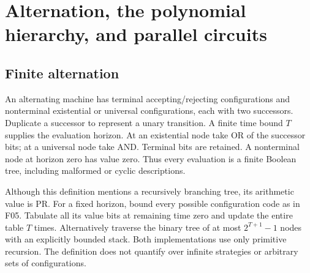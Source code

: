 \section{Alternation, the polynomial hierarchy, and parallel circuits}
\label{sec:alternation}

\subsection{Finite alternation}
An alternating machine has terminal accepting/rejecting configurations and nonterminal existential or universal configurations, each with two successors. Duplicate a successor to represent a unary transition. A finite time bound $T$ supplies the evaluation horizon. At an existential node take OR of the successor bits; at a universal node take AND. Terminal bits are retained. A nonterminal node at horizon zero has value zero. Thus every evaluation is a finite Boolean tree, including malformed or cyclic descriptions.

Although this definition mentions a recursively branching tree, its arithmetic value is PR. For a fixed horizon, bound every possible configuration code as in F05. Tabulate all its value bits at remaining time zero and update the entire table $T$ times. Alternatively traverse the binary tree of at most $2^{T+1}-1$ nodes with an explicitly bounded stack. Both implementations use only primitive recursion. The definition does not quantify over infinite strategies or arbitrary sets of configurations.

